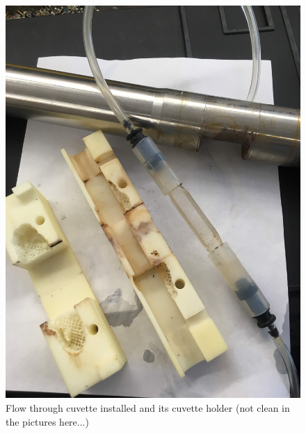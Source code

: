 \documentclass[]{book}
\begin{document}
\begin{figure}

{\centering \includegraphics[width=0.8\linewidth]{pictures/Cuvette1} 

}

\caption{Flow through cuvette installed and its cuvette holder (not clean in the pictures here...)}\label{fig:Cuvette1}
\end{figure}
\end{document}
